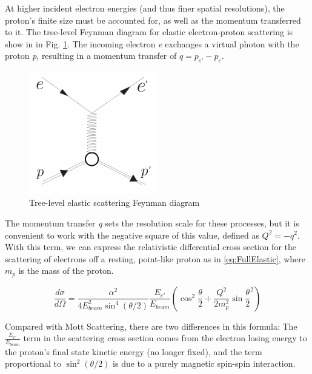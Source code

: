     
 
         At higher incident electron energies (and thus finer spatial resolutions), the proton's finite size must be accounted for, as well as the momentum transferred to it. The tree-level Feynman diagram for elastic electron-proton scattering is show in in Fig. \ref{fig:feynmanElastic}. The incoming electron \textit{e} exchanges a virtual photon with the proton \textit{p}, resulting in a momentum transfer of $q = p_{e'} - p_{e}$. 
         
        \begin{figure}[H]\label{fig:feynmanElastic}
            \centering
            \includegraphics[width=0.5\textwidth]{Chapters/Ch1-Intro/Ch1-Sec1-Background/pics/elastic_feynamn.png}
            \caption{Tree-level elastic scattering Feynman diagram}
        \end{figure}

        The momentum transfer \textit{q} sets the resolution scale for these processes, but it is convenient to work with the negative square of this value, defined as $Q^2 = -q^2$. With this term, we can express the relativistic differential cross section for the scattering of electrons off a resting, point-like proton as in \eqref{eq:FullElastic}, where $m_p$ is the mass of the proton. 

            \begin{equation}\label{eq:FullElastic}
                    \frac{d\sigma}{d\Omega} = \frac{\alpha^2}{4E_{beam}^2\sin^4{(\theta/2)}} \frac{E_{e'}}{E_{beam}} ( \cos^2{\frac{\theta}{2}} + \frac{Q^2}{2m_p^2}\sin{\frac{\theta}{2}}^2 )
            \end{equation}


            Compared with Mott Scattering, there are two differences in this formula: The $\frac{E_{e'}}{E_{beam}}$ term in the scattering cross section comes from the electron losing energy to the proton's final state kinetic energy (no longer fixed), and the term proportional to $\sin^2(\theta/2)$ is due to a purely magnetic spin-spin interaction. 



